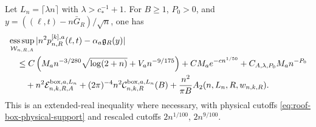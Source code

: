 \begin{corollary}
\label{cor:roof-box-raw-budget}
Let $L_n=\lceil\lambda n\rceil$ with $\lambda>c_*^{-1}+1$.
For $B\ge1$, $P_0>0$, and
$y=((\ell,t)-n\bar G_R)/\sqrt n$, one has
\begin{align}
 &\mathop{\rm ess\,sup}_{\mathcal W_{n,R,A}}
      |n^2p_{n,R}^{[k],a}(\ell,t)-\alpha_a\mathfrak g_R(y)|\notag\\
 &\quad\le C\left(M_an^{-3/280}\sqrt{\log(2+n)}+V_an^{-9/175}\right)
      +CM_ae^{-cn^{1/50}}+C_{A,\lambda,P_0}M_an^{-P_0}\notag\\
 &\qquad+n^2\mathcal E^{{\rm box},a,L_n}_{n,k,R,A}
   +(2\pi)^{-4}n^2\mathcal C^{{\rm box},a,L_n}_{n,k,R}(B)
   +\frac{n^2}{\pi B}A_2(n,L_n,R,w_{n,k,R}).
 \label{eq:roof-box-raw-budget}
\end{align}
This is an extended-real inequality where necessary, with physical
cutoffs \eqref{eq:roof-box-physical-support} and rescaled cutoffs
$2n^{1/100}$, $2n^{9/100}$.
\end{corollary}
